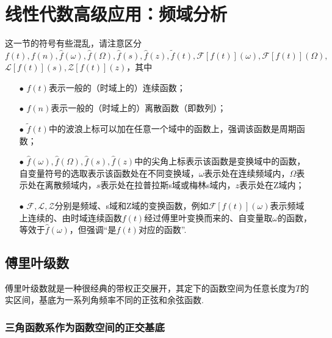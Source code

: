 \documentclass[main.tex]{subfiles}
\begin{document}
\section{线性代数高级应用：频域分析}

这一节的符号有些混乱，请注意区分\(f(t), f(n), \hat{f}(\omega), \hat{f}(\Omega), \hat{f}(s), \hat{f}(z), \tilde{f}(t), \mathcal{F}[f(t)](\omega), \mathcal{F}[f(t)](\Omega),\)
\newline
\(\mathcal{L}[f(t)](s), \mathcal{Z}[f(t)](z)\)，其中
\newline
\begin{itemize}
    \item[\(\bullet\)]
     \(f(t)\)表示一般的（时域上的）连续函数；
\end{itemize}
\begin{itemize}
    \item[\(\bullet\)]
    \(f(n)\)表示一般的（时域上的）离散函数（即数列）；
\end{itemize}
\begin{itemize}
    \item[\(\bullet\)]
    \(\tilde{f}(t)\)中的波浪上标可以加在任意一个域中的函数上，强调该函数是周期函数；
\end{itemize}
\begin{itemize}
    \item[\(\bullet\)]
    \(\hat{f}(\omega), \hat{f}(\Omega), \hat{f}(s), \hat{f}(z)\)中的尖角上标\(\hat{}\)表示该函数是变换域中的函数，自变量符号的选取表示该函数处在不同变换域，\(\omega\)表示处在连续频域内，\(\Omega\)表示处在离散频域内，\(s\)表示处在拉普拉斯s域或梅林s域内，\(z\)表示处在Z域内；
\end{itemize}
\begin{itemize}
    \item[\(\bullet\)]
    \(\mathcal{F}, \mathcal{L}, \mathcal{Z}\)分别是频域、s域和Z域的变换函数，例如\(\mathcal{F}[f(t)](\omega)\)表示频域上连续的、由时域连续函数\(f(t)\)经过傅里叶变换而来的、自变量取\(\omega\)的函数，等效于\(\hat{f}(\omega)\)，但强调“是\(f(t)\)对应的函数”.
\end{itemize}

\subsection{傅里叶级数}

傅里叶级数就是一种很经典的带权正交展开，其定下的函数空间为任意长度为\(T\)的实区间，基底为一系列角频率不同的正弦和余弦函数.

\subsubsection{三角函数系作为函数空间的正交基底}
\end{document}
